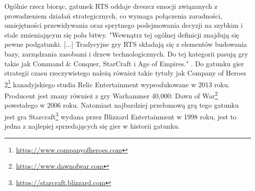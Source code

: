 Ogólnie rzecz biorąc, gatunek RTS oddaje dreszcz emocji związanych z prowadzeniem działań strategicznych, co wymaga połączenia zaradności,
umiejętności przewidywania oraz sprytnego podejmowania decyzji na szybkim i stale zmieniającym się polu bitwy.
"Wewnątrz tej ogólnej definicji znajdują się pewne podgatunki. [...] Tradycyjne gry RTS składają się z elementów budowania bazy, zarządzania zasobami i drzew technologicznych. Do tej kategorii pasują gry takie jak Command \& Conquer, StarCraft i Age of Empires." \cite{stateoftherts}.
Do gatunku gier strategii czasu rzeczywistego należą również takie tytuły jak Company of Heroes 2\footnote{\url{https://www.companyofheroes.com}} kanadyjskiego studia 
Relic Entertainment wyprodukowane w 2013 roku. Producent jest znany również z gry Warhammer 40,000: Dawn of War\footnote{\url{https://www.dawnofwar.com}} powstałego w 2006 roku.
Natomiast najbardziej przełomową grą tego gatunku jest gra Starcraft\footnote{\url{https://starcraft.blizzard.com}} wydana przez Blizzard Entertainment w 1998 roku, jest to jedna z najlepiej sprzedających się gier w historii gatunku\cite{rtslist}.
